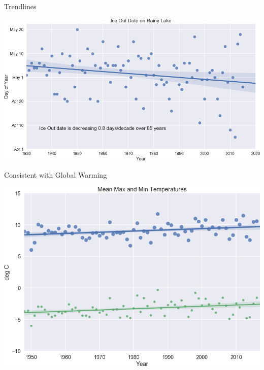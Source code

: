 \documentclass[compress,english]{beamer}
\begin{document}
\begin{frame}{Trendlines}

\begin{center}
\includegraphics[width=0.8\paperwidth]{IceOutTrendLine.png}
\end{center}

\end{frame}

\begin{frame}{Consistent with Global Warming}

\begin{center}
\includegraphics[width=0.8\paperwidth]{TempTrend.png}
\end{center}

\end{frame}
\end{document}
